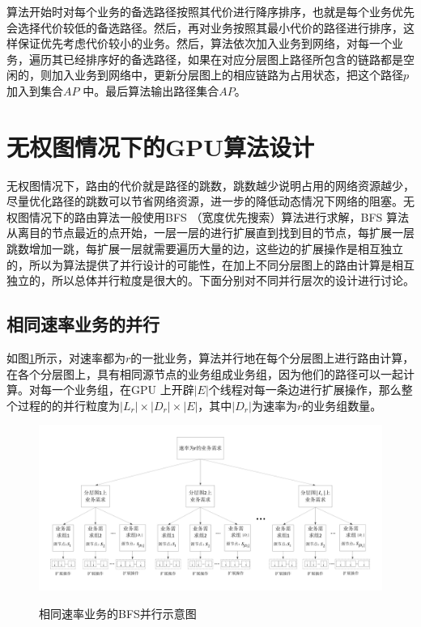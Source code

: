 算法开始时对每个业务的备选路径按照其代价进行降序排序，也就是每个业务优先会选择代价较低的备选路径。然后，再对业务按照其最小代价的路径进行排序，这样保证优先考虑代价较小的业务。然后，算法依次加入业务到网络，对每一个业务，遍历其已经排序好的备选路径，如果在对应分层图上路径所包含的链路都是空闲的，则加入业务到网络中，更新分层图上的相应链路为占用状态，把这个路径$p$ 加入到集合$AP$ 中。最后算法输出路径集合$AP$。
\section{无权图情况下的GPU算法设计}

无权图情况下，路由的代价就是路径的跳数，跳数越少说明占用的网络资源越少，尽量优化路径的跳数可以节省网络资源，进一步的降低动态情况下网络的阻塞。无权图情况下的路由算法一般使用BFS （宽度优先搜索）算法进行求解，BFS 算法从离目的节点最近的点开始，一层一层的进行扩展直到找到目的节点，每扩展一层跳数增加一跳，每扩展一层就需要遍历大量的边，这些边的扩展操作是相互独立的，所以为算法提供了并行设计的可能性，在加上不同分层图上的路由计算是相互独立的，所以总体并行粒度是很大的。下面分别对不同并行层次的设计进行讨论。
\subsection {相同速率业务的并行}

如图\ref{bfs}所示，对速率都为$r$的一批业务，算法并行地在每个分层图上进行路由计算，在各个分层图上，具有相同源节点的业务组成业务组，因为他们的路径可以一起计算。对每一个业务组，在GPU 上开辟$|E|$个线程对每一条边进行扩展操作，那么整个过程的的并行粒度为$|L_r|\times|D_r|\times|E|$，其中$|D_r|$为速率为$r$的业务组数量。
\begin{figure}
\setlength{\belowcaptionskip}{-0.5cm}
\begin{center}
{\includegraphics[width=1 \textwidth]{figures/bfs.pdf}}
\end{center}
\caption{{\footnotesize{相同速率业务的BFS并行示意图}}}
\label{bfs}
\end{figure}
